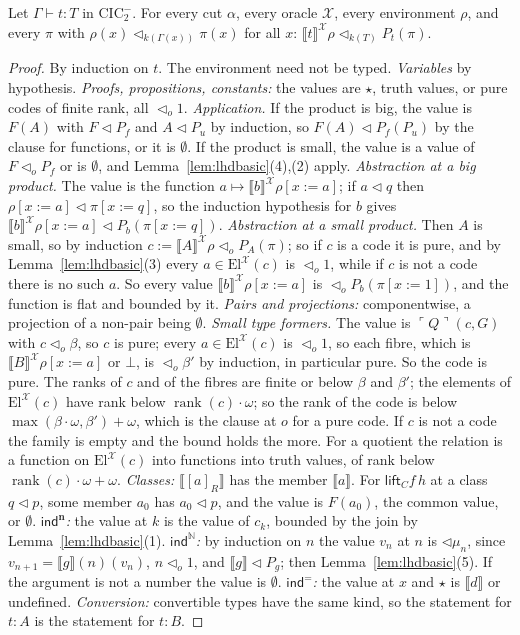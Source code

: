 \documentclass[10pt]{article}
\newcommand{\N}{\mathbb{N}}
\newcommand{\CIC}{\mathrm{CIC}}
\newcommand{\rk}{\operatorname{rank}}
\newcommand{\sem}[1]{\llbracket #1\rrbracket}
\newcommand{\El}{\mathrm{El}}
\newcommand{\code}[1]{\ulcorner #1\urcorner}
\newcommand{\X}{\mathcal{X}}
\newcommand{\ind}{\mathsf{ind}}
\begin{document}
\begin{lemma}\label{lem:fund}
Let $\Gamma\vdash t:T$ in $\CIC_2^-$. For every cut $\alpha$, every oracle
$\X$, every environment $\rho$, and every $\pi$ with
$\rho(x)\lhd_{k(\Gamma(x))}\pi(x)$ for all $x$:
$\sem t^\X\rho\lhd_{k(T)}P_t(\pi)$.
\end{lemma}
\begin{proof}
By induction on $t$. The environment need not be typed.
\emph{Variables} by hypothesis. \emph{Proofs, propositions, constants:}
the values are $\star$, truth values, or pure codes of finite rank, all
$\lhd_o1$. \emph{Application.} If the product is big, the value is
$F(A)$ with $F\lhd P_f$ and $A\lhd P_u$ by induction, so
$F(A)\lhd P_f(P_u)$ by the clause for functions, or it is $\emptyset$. If
the product is small, the value is a value of $F\lhd_oP_f$ or is
$\emptyset$, and Lemma~\ref{lem:lhdbasic}(4),(2) apply.
\emph{Abstraction at a big product.} The value is the function
$a\mapsto\sem b^\X\rho[x{:=}a]$; if $a\lhd q$ then
$\rho[x{:=}a]\lhd\pi[x{:=}q]$, so the induction hypothesis for $b$ gives
$\sem b^\X\rho[x{:=}a]\lhd P_b(\pi[x{:=}q])$.
\emph{Abstraction at a small product.} Then $A$ is small, so by
induction $c:=\sem A^\X\rho\lhd_oP_A(\pi)$; so if $c$ is a code it is
pure, and by Lemma~\ref{lem:lhdbasic}(3) every $a\in\El^\X(c)$ is
$\lhd_o1$, while if $c$ is not a code there is no such $a$. So every value
$\sem b^\X\rho[x{:=}a]$ is $\lhd_oP_b(\pi[x{:=}1])$, and the function is
flat and bounded by it.
\emph{Pairs and projections:} componentwise, a projection of a non-pair
being $\emptyset$.
\emph{Small type formers.} The value is $\code Q(c,G)$ with
$c\lhd_o\beta$, so $c$ is pure; every $a\in\El^\X(c)$ is $\lhd_o1$, so each
fibre, which is $\sem B^\X\rho[x{:=}a]$ or $\bot$, is
$\lhd_o\beta'$ by induction, in particular pure. So the code is pure. The
ranks of $c$ and of the fibres are finite or below $\beta$ and $\beta'$;
the elements of $\El^\X(c)$ have rank below
$\rk(c)\cdot\omega$; so the rank of the code is below
$\max(\beta\cdot\omega,\beta')+\omega$, which is the clause at $o$ for a
pure code. If $c$ is not a code the family is empty and the bound holds
the more.
For a quotient the relation is a function on $\El^\X(c)$ into functions
into truth values, of rank below $\rk(c)\cdot\omega+\omega$.
\emph{Classes:} $\sem{[a]_R}$ has the member $\sem a$. For
$\mathsf{lift}_Cf\,h$ at a class $q\lhd p$, some member $a_0$ has
$a_0\lhd p$, and the value is $F(a_0)$, the common value, or $\emptyset$.
\emph{$\ind^{\mathbf n}$:} the value at $k$ is the value of $c_k$, bounded
by the join by Lemma~\ref{lem:lhdbasic}(1).
\emph{$\ind^\N$:} by induction on $n$ the value $v_n$ at $n$ is
$\lhd\mu_n$, since $v_{n+1}=\sem g(n)(v_n)$, $n\lhd_o1$, and
$\sem g\lhd P_g$; then Lemma~\ref{lem:lhdbasic}(5). If the argument is not
a number the value is $\emptyset$.
\emph{$\ind^=$:} the value at $x$ and $\star$ is $\sem d$ or undefined.
\emph{Conversion:} convertible types have the same kind, so the
statement for $t:A$ is the statement for $t:B$.
\end{proof}
\end{document}
